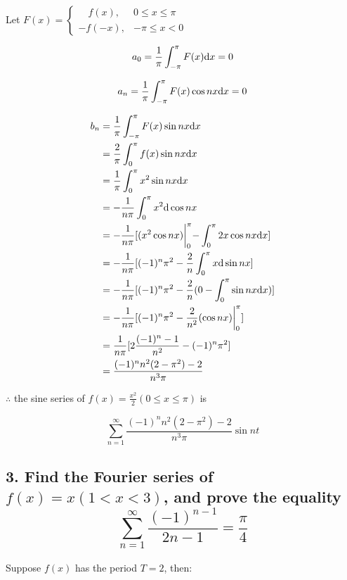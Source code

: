 \documentclass{article}
\begin{document}
    Let $F(x) = \left\{ \begin{array}{ll} \quad f(x), &0 \leq x \leq \pi \\ -f(-x), &-\pi \leq x < 0 \end{array}\right.$

    $$\begin{aligned}
        a_0 = \frac 1 \pi \int_{-\pi}^\pi F(x) \textrm dx = 0
    \end{aligned}$$

    $$\begin{aligned}
        a_n = \frac 1 \pi \int_{-\pi}^\pi F(x) \cos nx \textrm dx = 0
    \end{aligned}$$

    $$\begin{aligned}
        b_n &= \frac 1 \pi \int_{-\pi}^\pi F(x) \sin nx \textrm dx \\
        &= \frac 2 \pi \int_0^\pi f(x)\sin nx \textrm dx \\
        &= \frac 1 \pi \int_0^\pi x^2 \sin nx \textrm dx \\
        &= -\frac{1}{n\pi} \int_0^\pi x^2 \textrm d\cos nx \\
        &= -\frac{1}{n\pi} [(x^2\cos nx)\biggl|_0^\pi - \int_0^\pi 2x\cos nx \textrm dx] \\
        &= -\frac{1}{n\pi} [(-1)^n \pi^2 - \frac{2}{n} \int_0^\pi x\textrm d\sin nx] \\
        &= -\frac{1}{n\pi} [(-1)^n \pi^2 - \frac 2 n (0 - \int_0^\pi \sin nx \textrm dx)] \\
        &= -\frac{1}{n\pi} [(-1)^n \pi^2 - \frac{2}{n^2} (\cos nx)\biggl|_0^\pi] \\
        &= \frac{1}{n\pi} [2\frac{(-1)^n - 1}{n^2} - (-1)^n \pi^2 ] \\
        &= \frac{(-1)^n n^2(2 - \pi^2) - 2}{n^3\pi}
    \end{aligned}$$

    $\therefore$ the sine series of $f(x) = \frac{x^2}{2}(0 \leq x \leq \pi)$ is 
    
    $$\sum_{n=1}^\infty \frac{(-1)^n n^2(2 - \pi^2) - 2}{n^3\pi} \sin nt$$

    \subsection*{3. Find the Fourier series of $f(x) = x(1 < x < 3)$, and prove the equality$$\sum_{n=1}^\infty \frac{(-1)^{n-1}}{2n-1} = \frac \pi 4$$}

    Suppose $f(x)$ has the period $T = 2$, then:
    
\end{document}
